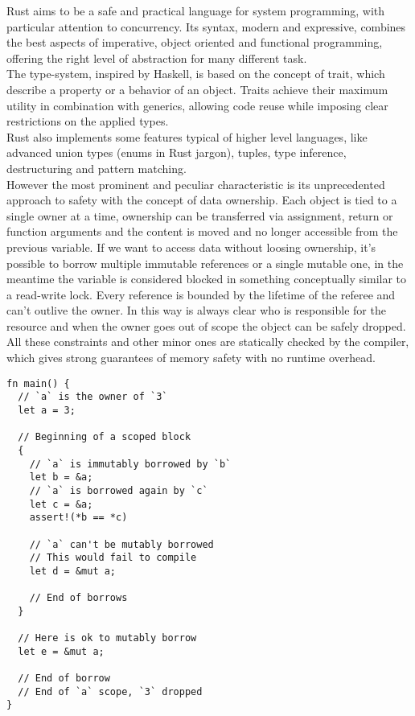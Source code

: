 Rust aims to be a safe and practical language for system programming, with particular attention to concurrency. Its syntax, modern and expressive, combines the best aspects of imperative, object oriented and functional programming, offering the right level of abstraction for many different task.\\
The type-system, inspired by Haskell, is based on the concept of trait, which describe a property or a behavior of an object. Traits achieve their maximum utility in combination with generics, allowing code reuse while imposing clear restrictions on the applied types.\\
Rust also implements some features typical of higher level languages, like advanced union types (enums in Rust jargon), tuples, type inference, destructuring and pattern matching.\\
However the most prominent and peculiar characteristic is its unprecedented approach to safety with the concept of data ownership. Each object is tied to a single owner at a time, ownership can be transferred via assignment, return or function arguments and the content is moved and no longer accessible from the previous variable. If we want to access data without loosing ownership, it's possible to borrow multiple immutable references or a single mutable one, in the meantime the variable is considered blocked in something conceptually similar to a read-write lock. Every reference is bounded by the lifetime of the referee and can't outlive the owner. In this way is always clear who is responsible for the resource and when the owner goes out of scope the object can be safely dropped.\\
All these constraints and other minor ones are statically checked by the compiler, which gives strong guarantees of memory safety with no runtime overhead.

\begin{minipage}{\textwidth}
\begin{lstlisting}[caption={Example of borrow},label={lst:ownership}]
fn main() {
  // `a` is the owner of `3`
  let a = 3;
  
  // Beginning of a scoped block
  {
    // `a` is immutably borrowed by `b`
    let b = &a;
    // `a` is borrowed again by `c`
    let c = &a;
    assert!(*b == *c)

    // `a` can't be mutably borrowed
    // This would fail to compile
    let d = &mut a;

    // End of borrows
  }

  // Here is ok to mutably borrow
  let e = &mut a;
  
  // End of borrow
  // End of `a` scope, `3` dropped
}
\end{lstlisting}
\end{minipage}\\

